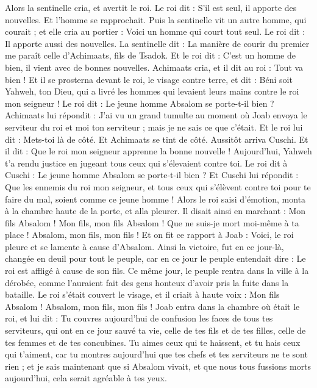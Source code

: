 \begin{multicols}{2}
Alors la sentinelle cria, et avertit le roi. Le roi dit : S'il est seul, il apporte des nouvelles. Et l’homme se rapprochait.
Puis la sentinelle vit un autre homme, qui courait ; et elle cria au portier : Voici un homme qui court tout seul. Le roi dit : Il apporte aussi des nouvelles.
La sentinelle dit : La manière de courir du premier me paraît celle d'Achimaats, fils de Tsadok. Et le roi dit : C'est un homme de bien, il vient avec de bonnes nouvelles.
Achimaats cria, et il dit au roi : Tout va bien ! Et il se prosterna devant le roi, le visage contre terre, et dit : Béni soit Yahweh, ton Dieu, qui a livré les hommes qui levaient leurs mains contre le roi mon seigneur !
Le roi dit : Le jeune homme Absalom se porte-t-il bien ? Achimaats lui répondit : J'ai vu un grand tumulte au moment où Joab envoya le serviteur du roi et moi ton serviteur ; mais je ne sais ce que c'était.
Et le roi lui dit : Mets-toi là de côté. Et Achimaats se tint de côté.
Aussitôt arriva Cuschi. Et il dit : Que le roi mon seigneur apprenne la bonne nouvelle ! Aujourd'hui, Yahweh t'a rendu justice en jugeant tous ceux qui s'élevaient contre toi.
Le roi dit à Cuschi : Le jeune homme Absalom se porte-t-il bien ? Et Cuschi lui répondit : Que les ennemis du roi mon seigneur, et tous ceux qui s’élèvent contre toi pour te faire du mal, soient comme ce jeune homme !
Alors le roi saisi d’émotion, monta à la chambre haute de la porte, et alla pleurer. Il disait ainsi en marchant : Mon fils Absalom ! Mon fils, mon fils Absalom ! Que ne suis-je mort moi-même à ta place ! Absalom, mon fils, mon fils !
\VerseOne{}Et on fit ce rapport à Joab : Voici, le roi pleure et se lamente à cause d'Absalom.
Ainsi la victoire, fut en ce jour-là, changée en deuil pour tout le peuple, car en ce jour le peuple entendait dire : Le roi est affligé à cause de son fils.
Ce même jour, le peuple rentra dans la ville à la dérobée, comme l'auraient fait des gens honteux d'avoir pris la fuite dans la bataille.
Le roi s’était couvert le visage, et il criait à haute voix : Mon fils Absalom ! Absalom, mon fils, mon fils !
Joab entra dans la chambre où était le roi, et lui dit : Tu couvres aujourd'hui de confusion les faces de tous tes serviteurs, qui ont en ce jour sauvé ta vie, celle de tes fils et de tes filles, celle de tes femmes et de tes concubines.
Tu aimes ceux qui te haïssent, et tu hais ceux qui t'aiment, car tu montres aujourd'hui que tes chefs et tes serviteurs ne te sont rien ; et je sais maintenant que si Absalom vivait, et que nous tous fussions morts aujourd'hui, cela serait agréable à tes yeux.

\end{multicols}
